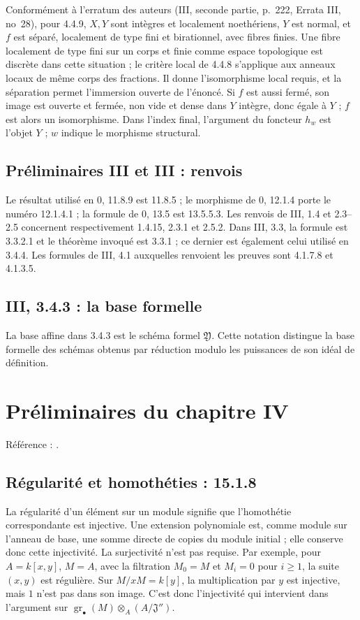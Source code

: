 \documentclass[11pt,a4paper]{article}
\begin{document}
Conformément à l’erratum des auteurs (III, seconde partie, p.~222, Errata III, no~28), pour 4.4.9, $X,Y$ sont intègres et localement noethériens,
$Y$ est normal, et $f$ est séparé, localement de type fini et
birationnel, avec fibres finies. Une fibre localement de type
fini sur un corps et finie comme espace topologique est discrète
dans cette situation ; le critère local de 4.4.8 s'applique
aux anneaux locaux de même corps des fractions.
Il donne l'isomorphisme local requis, et la séparation permet
l'immersion ouverte de l'énoncé. Si $f$ est aussi fermé, son
image est ouverte et fermée, non vide et dense dans $Y$
intègre, donc égale à $Y$ ; $f$ est alors un isomorphisme.
Dans l'index final, l'argument du foncteur $h_w$ est l'objet
$Y$ ; $w$ indique le morphisme structural.

\subsection{Préliminaires III et III : renvois}
\label{note:base3-refs}
Le résultat utilisé en 0, 11.8.9 est 11.8.5 ; le morphisme
de 0, 12.1.4 porte le numéro 12.1.4.1 ; la formule de
0, 13.5 est 13.5.5.3. Les renvois de III, 1.4 et 2.3--2.5
concernent respectivement 1.4.15, 2.3.1 et 2.5.2.
Dans III, 3.3, la formule est 3.3.2.1 et le théorème invoqué
est 3.3.1 ; ce dernier est également celui utilisé en 3.4.4.
Les formules de III, 4.1 auxquelles renvoient les preuves
sont 4.1.7.8 et 4.1.3.5.

\subsection{III, 3.4.3 : la base formelle}
\label{note:base3-formalbase}
La base affine dans 3.4.3 est le schéma formel $\mathfrak Y$.
Cette notation distingue la base formelle des schémas obtenus
par réduction modulo les puissances de son idéal de définition.
\par

\section{Préliminaires du chapitre IV}
\label{part:iv1}
Référence : \cite{EGAIV1}.
\subsection{Régularité et homothéties : 15.1.8}
\label{note:iv1-1}
La régularité d'un élément sur un module signifie que l'homothétie
correspondante est injective. Une extension polynomiale est, comme module
sur l'anneau de base, une somme directe de copies du module initial ; elle
conserve donc cette injectivité. La surjectivité n'est pas requise.
Par exemple, pour $A=k[x,y]$, $M=A$, avec la filtration $M_0=M$ et
$M_i=0$ pour $i\geq1$, la suite $(x,y)$ est régulière. Sur
$M/xM=k[y]$, la multiplication par $y$ est injective, mais $1$ n'est
pas dans son image. C'est donc l'injectivité qui intervient dans
l'argument sur $\operatorname{gr}_\bullet(M)\otimes_A(A/\mathfrak J'')$.
\end{document}
